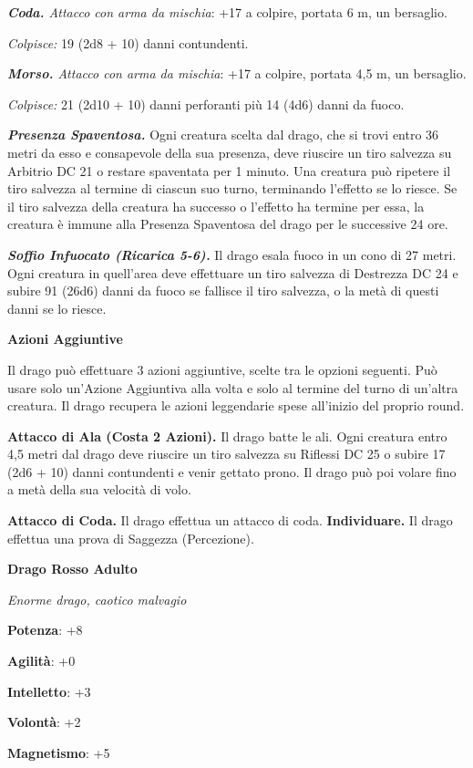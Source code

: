 \begin{multicols}{2}
\emph{\textbf{Coda.} Attacco con arma da mischia}: +17 a colpire,
portata 6 m, un bersaglio.

\emph{Colpisce:} 19 (2d8 + 10) danni contundenti.

\emph{\textbf{Morso.} Attacco con arma da mischia}: +17 a colpire,
portata 4,5 m, un bersaglio.

\emph{Colpisce:} 21 (2d10 + 10) danni perforanti più 14 (4d6) danni da
fuoco.

\emph{\textbf{Presenza Spaventosa.}} Ogni creatura scelta dal drago, che
si trovi entro 36 metri da esso e consapevole della sua presenza, deve
riuscire un tiro salvezza su Arbitrio DC 21 o restare spaventata per 1
minuto. Una creatura può ripetere il tiro salvezza al termine di ciascun
suo turno, terminando l'effetto se lo riesce. Se il tiro salvezza della
creatura ha successo o l'effetto ha termine per essa, la creatura è
immune alla Presenza Spaventosa del drago per le successive 24 ore.

\emph{\textbf{Soffio Infuocato (Ricarica 5-6).}} Il drago esala fuoco in
un cono di 27 metri. Ogni creatura in quell'area deve effettuare un tiro
salvezza di Destrezza DC 24 e subire 91 (26d6) danni da fuoco se
fallisce il tiro salvezza, o la metà di questi danni se lo riesce.

\textbf{Azioni Aggiuntive}

Il drago può effettuare 3 azioni aggiuntive, scelte tra le opzioni
seguenti. Può usare solo un'Azione Aggiuntiva alla volta e solo al
termine del turno di un'altra creatura. Il drago recupera le azioni
leggendarie spese all'inizio del proprio round.

\textbf{Attacco di Ala (Costa 2 Azioni).} Il drago batte le ali. Ogni
creatura entro 4,5 metri dal drago deve riuscire un tiro salvezza su Riflessi DC 25 o subire 17 (2d6 + 10) danni contundenti e venir gettato
prono. Il drago può poi volare fino a metà della sua velocità di volo.

\textbf{Attacco di Coda.} Il drago effettua un attacco di coda.
\textbf{Individuare.} Il drago effettua una prova di Saggezza
(Percezione).

\textbf{Drago Rosso Adulto}

\emph{Enorme drago, caotico malvagio}

\textbf{Potenza}: +8

\textbf{Agilità}: +0

\textbf{Intelletto}: +3

\textbf{Volontà}: +2

\textbf{Magnetismo}: +5


\end{multicols}
